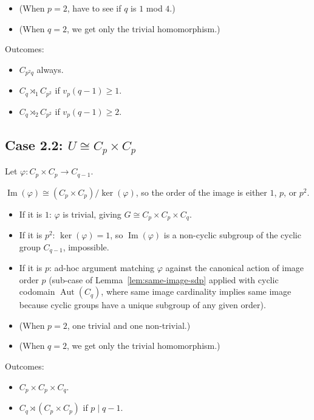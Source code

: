 \begin{itemize}
    \item (When $p = 2$, have to see if $q$ is $1$ mod $4$.)
    \item (When $q = 2$, we get only the trivial homomorphism.)
\end{itemize}

Outcomes:
\begin{itemize}
    \item $C_{p^2 q}$ always.
    \item $C_q \rtimes_1 C_{p^2}$ if $v_p(q - 1) \geq 1$.
    \item $C_q \rtimes_2 C_{p^2}$ if $v_p(q - 1) \geq 2$.
\end{itemize}

\subsection{Case 2.2: $U \cong C_p \times C_p$}

Let $\varphi : C_p \times C_p \to C_{q-1}$.

$\operatorname{Im}(\varphi) \cong (C_p \times C_p) / \ker(\varphi)$, so the
order of the image is either $1$, $p$, or $p^2$.
\begin{itemize}
    \item If it is $1$: $\varphi$ is trivial, giving
        $G \cong C_p \times C_p \times C_q$.
    \item If it is $p^2$: $\ker(\varphi) = 1$, so $\operatorname{Im}(\varphi)$
        is a non-cyclic subgroup of the cyclic group $C_{q-1}$, impossible.
    \item If it is $p$: ad-hoc argument matching $\varphi$ against the
        canonical action of image order $p$ (sub-case of
        Lemma~\ref{lem:same-image-sdp} applied with cyclic codomain
        $\operatorname{Aut}(C_q)$, where same image cardinality implies same
        image because cyclic groups have a unique subgroup of any given order).
\end{itemize}

\begin{itemize}
    \item (When $p = 2$, one trivial and one non-trivial.)
    \item (When $q = 2$, we get only the trivial homomorphism.)
\end{itemize}

Outcomes:
\begin{itemize}
    \item $C_p \times C_p \times C_q$.
    \item $C_q \rtimes (C_p \times C_p)$ if $p \mid q - 1$.
\end{itemize}

